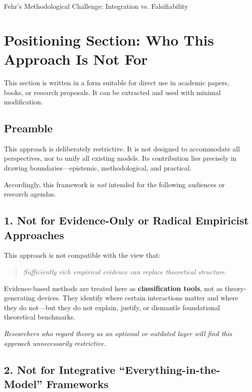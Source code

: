 \begin{chapter}{Fehr's Methodological Challenge: Integration vs. Falsifiability}
\section{Positioning Section: Who This Approach Is Not For}
\label{sec:positioning}

\begin{tcolorbox}[colback=gray!5!white,colframe=gray!75!black,title=\textbf{Note: This Section Is Publication-Ready}]
This section is written in a form suitable for direct use in academic papers, books, or research proposals. It can be extracted and used with minimal modification.
\end{tcolorbox}

\subsection{Preamble}

This approach is deliberately restrictive.
It is not designed to accommodate all perspectives, nor to unify all existing models.
Its contribution lies precisely in drawing boundaries---epistemic, methodological, and practical.

Accordingly, this framework is \textit{not} intended for the following audiences or research agendas.

\subsection{1. Not for Evidence-Only or Radical Empiricist Approaches}

This approach is not compatible with the view that:

\begin{quote}
\textit{Sufficiently rich empirical evidence can replace theoretical structure.}
\end{quote}

Evidence-based methods are treated here as \textbf{classification tools}, not as theory-generating devices.
They identify where certain interactions matter and where they do not---but they do not explain, justify, or dismantle foundational theoretical benchmarks.

\textit{Researchers who regard theory as an optional or outdated layer will find this approach unnecessarily restrictive.}

\subsection{2. Not for Integrative ``Everything-in-the-Model'' Frameworks}


\end{chapter}
